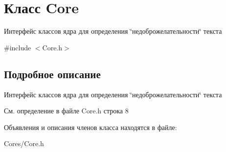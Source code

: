 \hypertarget{class_core}{}\section{Класс Core}
\label{class_core}


Интерфейс классов ядра для определения \char`\"{}недоброжелательности\char`\"{} текста  




{\ttfamily \#include $<$Core.\+h$>$}



\subsection{Подробное описание}
Интерфейс классов ядра для определения \char`\"{}недоброжелательности\char`\"{} текста 

См. определение в файле Core.\+h строка 8



Объявления и описания членов класса находятся в файле\+:\begin{DoxyCompactItemize}
\item 
Cores/Core.\+h\end{DoxyCompactItemize}
